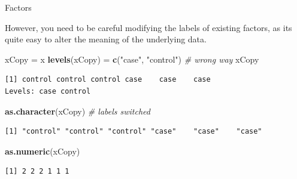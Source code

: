\documentclass[
  ignorenonframetext,
]{beamer}
\newenvironment{Shaded}{\begin{snugshade}}{\end{snugshade}}
\newcommand{\CommentTok}[1]{\textcolor[rgb]{0.56,0.35,0.01}{\textit{#1}}}
\newcommand{\KeywordTok}[1]{\textcolor[rgb]{0.13,0.29,0.53}{\textbf{#1}}}
\newcommand{\NormalTok}[1]{#1}
\newcommand{\StringTok}[1]{\textcolor[rgb]{0.31,0.60,0.02}{#1}}
\begin{document}
\begin{frame}[fragile]{Factors}
\protect\hypertarget{factors-5}{}

However, you need to be careful modifying the labels of existing
factors, as its quite easy to alter the meaning of the underlying data.

\begin{Shaded}
\begin{Highlighting}[]
\NormalTok{xCopy =}\StringTok{ }\NormalTok{x}
\KeywordTok{levels}\NormalTok{(xCopy) =}\StringTok{ }\KeywordTok{c}\NormalTok{(}\StringTok{"case"}\NormalTok{, }\StringTok{"control"}\NormalTok{) }\CommentTok{# wrong way}
\NormalTok{xCopy        }
\end{Highlighting}
\end{Shaded}

\begin{verbatim}
[1] control control control case    case    case   
Levels: case control
\end{verbatim}

\begin{Shaded}
\begin{Highlighting}[]
\KeywordTok{as.character}\NormalTok{(xCopy) }\CommentTok{# labels switched}
\end{Highlighting}
\end{Shaded}

\begin{verbatim}
[1] "control" "control" "control" "case"    "case"    "case"   
\end{verbatim}

\begin{Shaded}
\begin{Highlighting}[]
\KeywordTok{as.numeric}\NormalTok{(xCopy)}
\end{Highlighting}
\end{Shaded}

\begin{verbatim}
[1] 2 2 2 1 1 1
\end{verbatim}

\end{frame}
\end{document}
